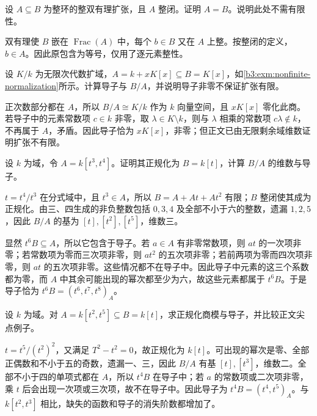 \begin{exercise}\label{b3:ex:06-normal-base-birational}
	设 \(A\subseteq B\) 为整环的整双有理扩张，且 \(A\) 整闭。证明 \(A=B\)。说明此处不需有限性。
\end{exercise}
\begin{solution}
	双有理使 \(B\) 嵌在 \(\operatorname{Frac}(A)\) 中，每个 \(b\in B\) 又在 \(A\) 上整。按整闭的定义，\(b\in A\)。因此原包含为等号，仅用了逐元素整性。
\end{solution}

\begin{exercise}\label{b3:ex:06-infinite-conductor}
	设 \(K/k\) 为无限次代数扩域，\(A=k+xK[x]\subseteq B=K[x]\)，如\cref{b3:exm:nonfinite-normalization}所示。计算导子与 \(B/A\)，并说明导子非零不保证扩张有限。
\end{exercise}
\begin{solution}
	正次数部分都在 \(A\)，所以 \(B/A\cong K/k\) 作为 \(k\) 向量空间，且 \(xK[x]\) 零化此商。若导子中的元素常数项 \(c\in k\) 非零，取 \(\lambda\in K\setminus k\)，则与 \(\lambda\) 相乘的常数项 \(c\lambda\notin k\)，不再属于 \(A\)，矛盾。因此导子恰为 \(xK[x]\)，非零；但正文已由无限剩余域维数证明扩张不有限。
\end{solution}

\begin{exercise}\label{b3:ex:06-three-four-cusp}
	设 \(k\) 为域，令 \(A=k[t^3,t^4]\)。证明其正规化为 \(B=k[t]\)，计算 \(B/A\) 的维数与导子。
\end{exercise}
\begin{solution}
	\(t=t^4/t^3\) 在分式域中，且 \(t^3\in A\)，所以 \(B=A+At+At^2\) 有限；\(B\) 整闭使其成为正规化。由三、四生成的非负整数包括 \(0,3,4\) 及全部不小于六的整数，遗漏 \(1,2,5\)，因此 \(B/A\) 的基为 \([t],[t^2],[t^5]\)，维数三。

	显然 \(t^6B\subseteq A\)，所以它包含于导子。若 \(a\in A\) 有非零常数项，则 \(at\) 的一次项非零；若常数项为零而三次项非零，则 \(at^2\) 的五次项非零；若前两项为零而四次项非零，则 \(at\) 的五次项非零。这些情况都不在导子中。因此导子中元素的这三个系数都为零，而 \(A\) 中其余可能出现的幂次都至少为六，故这些元素都属于 \(t^6B\)。于是导子恰为 \(t^6B=(t^6,t^7,t^8)_A\)。
\end{solution}

\begin{exercise}\label{b3:ex:06-two-five-cusp}
	设 \(k\) 为域。对 \(A=k[t^2,t^5]\subseteq B=k[t]\)，求正规化商模与导子，并比较正文尖点例子。
\end{exercise}
\begin{solution}
	\(t=t^5/(t^2)^2\)，又满足 \(T^2-t^2=0\)，故正规化为 \(k[t]\)。可出现的幂次是零、全部正偶数和不小于五的奇数，遗漏一、三，因此 \(B/A\) 有基 \([t],[t^3]\)，维数二。全部不小于四的单项式都在 \(A\)，所以 \(t^4B\) 在导子中；若 \(a\) 的常数项或二次项非零，乘 \(t\) 后会出现一次项或三次项，故不在导子中。因此导子为 \(t^4B=(t^4,t^5)_A\)。与 \(k[t^2,t^3]\) 相比，缺失的函数和导子的消失阶数都增加了。
\end{solution}

